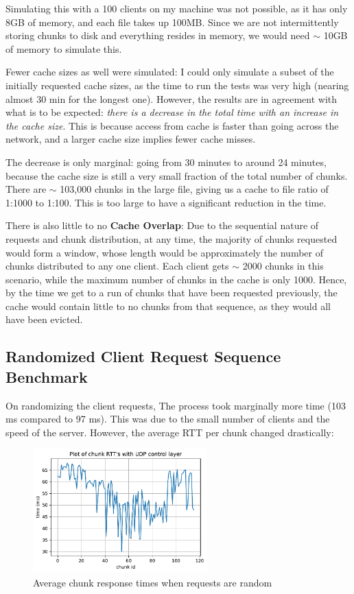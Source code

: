 \documentclass[12pt]{article}
\begin{document}
Simulating this with a 100 clients on my machine was not possible, as it has only 8GB of memory, and each file takes up 100MB. Since we are not intermittently storing chunks to disk and everything resides in memory, we would need $\sim$ 10GB of memory to simulate this.

Fewer cache sizes as well were simulated: I could only simulate a subset of the initially requested cache sizes, as the time to run the tests was very high (nearing almost 30 min for the longest one). However, the results are in agreement with what is to be expected: \emph{there is a decrease in the total time with an increase in the cache size}. This is because access from cache is faster than going across the network, and a larger cache size implies fewer cache misses. 

The decrease is only marginal: going from 30 minutes to around 24 minutes, because the cache size is still a very small fraction of the total number of chunks. There are $\sim$ 103,000 chunks in the large file, giving us a cache to file ratio of 1:1000 to 1:100. This is too large to have a significant reduction in the time. 

There is also little to no \textbf{Cache Overlap}: Due to the sequential nature of requests and chunk distribution, at any time, the majority of chunks requested would form a window, whose length would be approximately the number of chunks distributed to any one client. Each client gets $\sim$ 2000 chunks in this scenario, while the maximum number of chunks in the cache is only 1000. Hence, by the time we get to a run of chunks that have been requested previously, the cache would contain little to no chunks from that sequence, as they would all have been evicted.

\subsection{Randomized Client Request Sequence Benchmark}

On randomizing the client requests, The process took marginally more time (103 ms compared to 97 ms). This was due to the small number of clients and the speed of the server. However, the average RTT per chunk changed drastically:

\begin{figure}[H]
  \centering
  \includegraphics[width=0.6\textwidth]{random_req.pdf}
  \caption{Average chunk response times when requests are random}
\end{figure}
\end{document}

